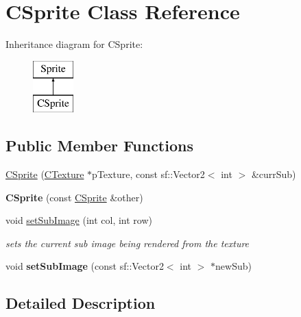 \hypertarget{classCSprite}{\section{C\-Sprite Class Reference}
\label{classCSprite}
}
Inheritance diagram for C\-Sprite\-:\begin{figure}[H]
\begin{center}
\leavevmode
\includegraphics[height=2.000000cm]{classCSprite}
\end{center}
\end{figure}
\subsection*{Public Member Functions}
\begin{DoxyCompactItemize}
\item 
\hyperlink{classCSprite_afdfe7ac25b872dbafd60e6329185b0c5}{C\-Sprite} (\hyperlink{classCTexture}{C\-Texture} $\ast$p\-Texture, const sf\-::\-Vector2$<$ int $>$ \&curr\-Sub)
\item 
\hypertarget{classCSprite_a7fa10fe45cf1683163671b7483ffc758}{{\bfseries C\-Sprite} (const \hyperlink{classCSprite}{C\-Sprite} \&other)}\label{classCSprite_a7fa10fe45cf1683163671b7483ffc758}

\item 
\hypertarget{classCSprite_a2162a3b87f87eecf9e9b93fe4c573690}{void \hyperlink{classCSprite_a2162a3b87f87eecf9e9b93fe4c573690}{set\-Sub\-Image} (int col, int row)}\label{classCSprite_a2162a3b87f87eecf9e9b93fe4c573690}

\begin{DoxyCompactList}\small\item\em sets the current sub image being rendered from the texture \end{DoxyCompactList}\item 
\hypertarget{classCSprite_a6e46dd766754438ebdefadf3449540da}{void {\bfseries set\-Sub\-Image} (const sf\-::\-Vector2$<$ int $>$ $\ast$new\-Sub)}\label{classCSprite_a6e46dd766754438ebdefadf3449540da}

\end{DoxyCompactItemize}


\subsection{Detailed Description}



